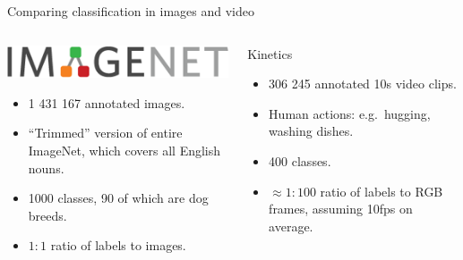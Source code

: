 \documentclass{beamer}
\begin{document}
{%
\begin{frame}{Comparing classification in images and video}
        \begin{columns}[T,onlytextwidth]

                        \begin{block}{\includegraphics[scale=0.15]{data/imagenet.png}}
                                \begin{itemize}
                                        \item 1 431 167 annotated images.
                                        \item ``Trimmed'' version of entire ImageNet, which covers all English nouns.
                                        \item 1000 classes, 90 of which are dog breeds.
                                        \item $1:1$ ratio of labels to images.
                                \end{itemize}
                        \end{block}
                        \begin{block}{Kinetics}
                                \begin{itemize}
                                        \item 306 245 annotated 10s video clips.
                                        \item Human actions: e.g.\ hugging, washing dishes.
                                        \item 400 classes.
                                        \item $\approx 1:100$ ratio of labels to RGB frames, assuming 10fps on average.
                                \end{itemize}
                        \end{block}
        \end{columns}
\end{frame}
}
\end{document}
